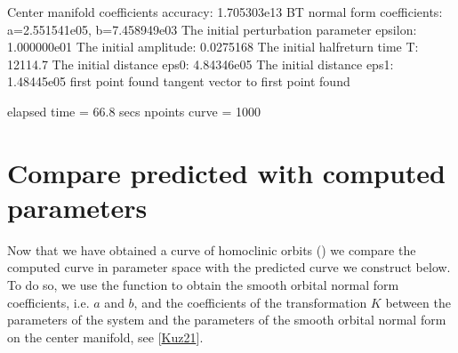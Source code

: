 \documentclass[letterpaper,10pt,english]{jupyterBook}
\begin{document}
\begin{sphinxVerbatim}[commandchars=\\\{\}]
\PYG{p}{[}\PYG{p}{]}
\PYG{p}{[}\PYG{p}{]}
\end{sphinxVerbatim}

\begin{sphinxVerbatim}[commandchars=\\\{\}]
Center manifold coefficients\PYGZsq{} accuracy: 1.705303e\PYGZhy{}13
BT normal form coefficients:
a=2.551541e\PYGZhy{}05,	 b=\PYGZhy{}7.458949e\PYGZhy{}03
The initial perturbation parameter epsilon:  1.000000e\PYGZhy{}01
The initial amplitude: 0.0275168
The initial half\PYGZhy{}return time T: 12114.7
The initial distance eps0: 4.84346e\PYGZhy{}05
The initial distance eps1: 1.48445e\PYGZhy{}05
first point found
tangent vector to first point found

elapsed time  = 66.8 secs
npoints curve = 1000
\end{sphinxVerbatim}


\section{Compare predicted with computed parameters}
\label{\detokenize{HodgkinHuxley:compare-predicted-with-computed-parameters}}
\sphinxAtStartPar
Now that we have obtained a curve of homoclinic orbits () we
compare the computed curve in parameter space with the predicted curve we
construct below. To do so, we use the function  to obtain the
smooth orbital normal form coefficients, i.e. \(a\) and \(b\), and the coefficients
of the transformation \(K\) between the parameters of the system and the parameters
of the smooth orbital normal form on the center manifold, see
{[}\hyperlink{cite.references:id3}{Kuz21}{]}.
\end{document}
